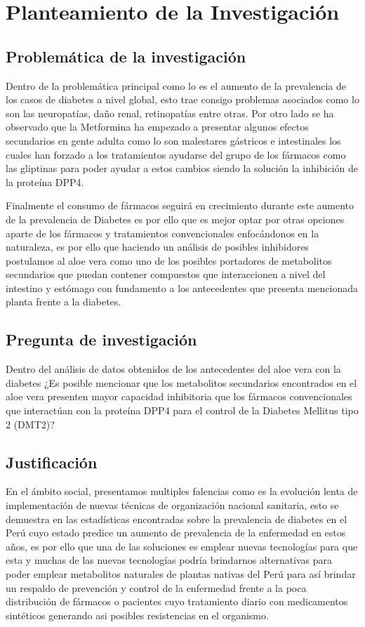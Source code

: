 \chapter{Planteamiento de la Investigación}
\renewcommand{\figurename}{Figura} 

\section{Problemática de la investigación}

Dentro de la problemática principal como lo es el aumento de la prevalencia de los casos de diabetes a nivel global, esto trae consigo problemas asociados como lo son las neuropatías, daño renal, retinopatías entre otras.%
Por otro lado se ha observado que la Metformina ha empezado a presentar algunos efectos secundarios en gente adulta como lo son malestares gástricos e intestinales los cuales han forzado a los tratamientos ayudarse del grupo de los fármacos como las gliptinas para poder ayudar a estos cambios siendo la solución la inhibición de la proteína DPP4.

Finalmente el consumo de fármacos seguirá en crecimiento durante este aumento de la prevalencia de Diabetes es por ello que es mejor optar por otras opciones aparte de los fármacos y tratamientos convencionales enfocándonos en la naturaleza, es por ello que haciendo un análisis de posibles inhibidores postulamos al aloe vera como uno de los posibles portadores de metabolitos secundarios que puedan contener compuestos que interaccionen a nivel del intestino y estómago con fundamento a los antecedentes que presenta mencionada planta frente a la diabetes.

\section{Pregunta de investigación}
Dentro del análisis de datos obtenidos de los antecedentes del aloe vera con la diabetes ¿Es posible mencionar que los metabolitos secundarios encontrados en el aloe vera presenten mayor capacidad inhibitoria que los  fármacos convencionales que interactúan con la proteína DPP4 para el control de la Diabetes Mellitus tipo 2 (DMT2)?

\section{Justificación}
En el ámbito social, presentamos multiples falencias como es la evolución lenta de implementación de nuevas técnicas de organización nacional sanitaria, esto se demuestra en las estadísticas encontradas sobre la prevalencia de diabetes en el Perú cuyo estado predice un aumento de prevalencia de la enfermedad en estos años, es por ello que una de las soluciones es emplear nuevas tecnologías para que esta y muchas de las nuevas tecnologías podría brindarnos alternativas para poder emplear metabolitos naturales de plantas nativas del Perú para así brindar un respaldo de prevención y control de la enfermedad frente a la poca distribución de fármacos o pacientes cuyo tratamiento diario con medicamentos sintéticos generando asi posibles resistencias en el organismo.  


